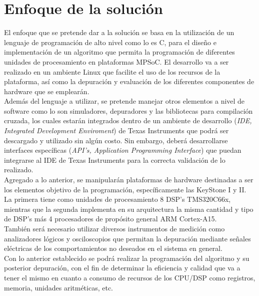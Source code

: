 

\chapter{Enfoque de la solución}
\label{ch:Enfoque_de_la_solucion}

El enfoque que se pretende dar a la solución se basa en la utilización de un lenguaje de programación
de alto nivel como lo es C, para el diseño e implementación de un algoritmo que permita la programación
de diferentes unidades de procesamiento en plataformas MPSoC. El desarrollo va a ser realizado en un ambiente
Linux que facilite el uso de los recursos de la plataforma, así como la depuración y evaluación de los diferentes
componentes de hardware que se emplearán.\\

Además del lenguaje a utilizar, se pretende manejar otros elementos a nivel de software como lo son simuladores, 
depuradores y las bibliotecas para compilación cruzada, los cuales estarán integrados dentro de un ambiente de 
desarrollo (\textit{IDE, Integrated Development Enviroment}) de Texas Instruments que podrá ser descargado y 
utilizado sin algún costo. Sin embargo, deberá desarrollarse interfaces específicas 
(\textit{API's, Application Programming Interface}) que puedan integrarse al IDE de Texas Instruments para 
la correcta validación de lo realizado.\\

Agregado a lo anterior, se manipularán plataformas de hardware destinadas a ser los elementos objetivo de la
programación, específicamente las KeyStone I y II. La primera tiene como unidades de procesamiento 8 DSP's 
TMS320C66x, mientras que la segunda implementa en su arquitectura la misma cantidad y tipo de DSP's
más 4 procesadores de propósito general ARM Cortex-A15.\\

También será necesario utilizar diversos instrumentos de medición como analizadores lógicos y osciloscopios
que permitan la depuración mediante señales eléctricas de los comportamientos no deseados en el sistema en general.\\

Con lo anterior establecido se podrá realizar la programación del algoritmo y su posterior depuración, con el fin de
determinar la eficiencia y calidad que va a tener el mismo en cuanto a consumo de recursos de los CPU/DSP como registros,
memoria, unidades aritméticas, etc.